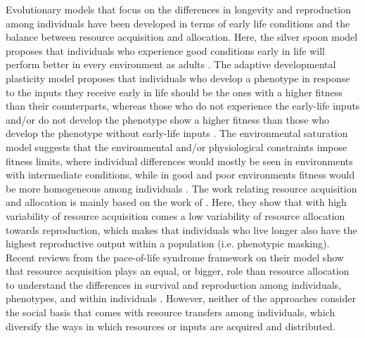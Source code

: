 \documentclass{article}
\begin{document}
Evolutionary models that focus on the differences in longevity and reproduction among individuals have been developed in terms of early life conditions and the balance between resource acquisition and allocation. Here, the silver spoon model proposes that individuals who experience good conditions early in life will perform better in every environment as adults \citep{pigeon2019silver,lummaa2002early}. The adaptive developmental plasticity model proposes that individuals who develop a phenotype in response to the inputs they receive early in life should be the ones with a higher fitness than their counterparts, whereas those who do not experience the early-life inputs and/or do not develop the phenotype show a higher fitness than those who develop the phenotype without early-life inputs \citep{bateson2004developmental,nettle2015adaptive}. The environmental saturation model suggests that the environmental and/or physiological constraints impose fitness limits, where individual differences would mostly be seen in environments with intermediate conditions, while in good and poor environments fitness would be more homogeneous among individuals \citep{engqvist2016adaptive}. The work relating resource acquisition and allocation is mainly based on the work of \cite{van1986acquisition}. Here, they show that with high variability of resource acquisition comes a low variability of resource allocation towards reproduction, which makes that individuals who live longer also have the highest reproductive output within a population (i.e. phenotypic masking). Recent reviews from the pace-of-life syndrome framework on their model show that resource acquisition plays an equal, or bigger, role than resource allocation to understand the differences in survival and reproduction among individuals, phenotypes, and within individuals \citep{laskowski2021integrating,haave2022differences}. However, neither of the approaches consider the social basis that comes with resource transfers among individuals, which diversify the ways in which resources or inputs are acquired and distributed.    
\end{document}
